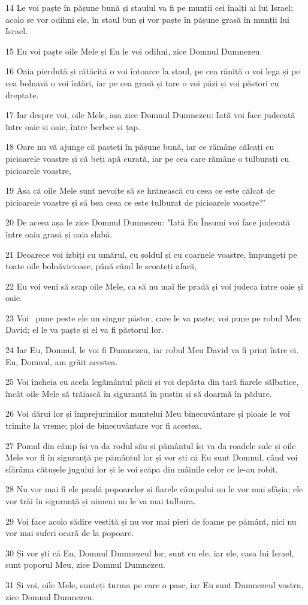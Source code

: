 \par 14 Le voi paște în pășune bună și staulul va fi pe munții cei înalți ai lui Israel; acolo se vor odihni ele, în staul bun și vor paște în pășune grasă în munții lui Israel.
\par 15 Eu voi paște oile Mele și Eu le voi odihni, zice Domnul Dumnezeu.
\par 16 Oaia pierdută și rătăcită o voi întoarce la staul, pe cea rănită o voi lega și pe cea bolnavă o voi întări, iar pe cea grasă și tare o voi păzi și voi păstori cu dreptate.
\par 17 Iar despre voi, oile Mele, așa zice Domnul Dumnezeu: Iată voi face judecată între oaie și oaie, între berbec și țap.
\par 18 Oare nu vă ajunge că pașteți în pășune bună, iar ce rămâne călcați cu picioarele voastre și că beți apă curată, iar pe cea care rămâne o tulburați cu picioarele voastre,
\par 19 Asa că oile Mele sunt nevoite să se hrănească cu ceea ce este călcat de picioarele voastre și să bea ceea ce este tulburat de picioarele voastre?"
\par 20 De aceea așa le zice Domnul Dumnezeu: "Iată Eu Însumi voi face judecată între oaia grasă și oaia slabă.
\par 21 Deoarece voi izbiți cu umărul, cu șoldul și cu coarnele voastre, împungeți pe toate oile bolnăvicioase, până când le scoateți afară,
\par 22 Eu voi veni să scap oile Mele, ca să nu mai fie pradă și voi judeca între oaie și oaie.
\par 23 Voi  pune peste ele un singur păstor, care le va paște; voi pune pe robul Meu David; el le va paște și el va fi păstorul lor.
\par 24 Iar Eu, Domnul, le voi fi Dumnezeu, iar robul Meu David va fi prinț între ei. Eu, Domnul, am grăit acestea.
\par 25 Voi încheia cu acela legământul păcii și voi depărta din țară fiarele sălbatice, încât oile Mele să trăiască în siguranță în pustiu și să doarmă în pădure.
\par 26 Voi dărui lor și împrejurimilor muntelui Meu binecuvântare și ploaie le voi trimite la vreme; ploi de binecuvântare vor fi acestea.
\par 27 Pomul din câmp își va da rodul său și pământul își va da roadele sale și oile Mele vor fi în siguranță pe pământul lor și vor ști că Eu sunt Domnul, când voi sfărâma cătușele jugului lor și le voi scăpa din mâinile celor ce le-au robit.
\par 28 Nu vor mai fi ele pradă popoarelor și fiarele câmpului nu le vor mai sfâșia; ele vor trăi în siguranță și nimeni nu le va mai tulbura.
\par 29 Voi face acolo sădire vestită și nu vor mai pieri de foame pe pământ, nici nu vor mai suferi ocară de la popoare.
\par 30 Și vor ști că Eu, Domnul Dumnezeul lor, sunt cu ele, iar ele, casa lui Israel, sunt poporul Meu, zice Domnul Dumnezeu.
\par 31 Și voi, oile Mele, sunteți turma pe care o pasc, iar Eu sunt Dumnezeul vostru, zice Domnul Dumnezeu.

